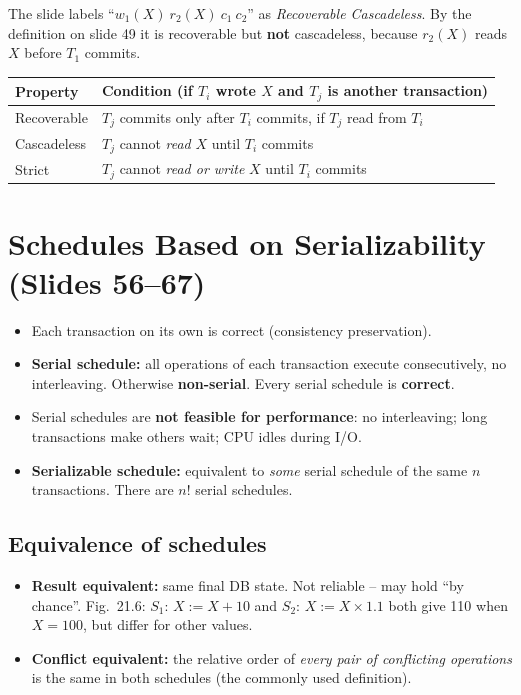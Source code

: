 \documentclass[10pt,a4paper]{article}
\begin{document}
\begin{warnbox}
The slide labels ``$w_1(X)\ r_2(X)\ c_1\ c_2$'' as \emph{Recoverable Cascadeless}. By the definition on slide 49 it is recoverable but \textbf{not} cascadeless, because $r_2(X)$ reads $X$ before $T_1$ commits.
\end{warnbox}

\begin{tabular}{@{}ll@{}}
\toprule
\textbf{Property} & \textbf{Condition} (if $T_i$ wrote $X$ and $T_j$ is another transaction)\\\midrule
Recoverable & $T_j$ commits only after $T_i$ commits, if $T_j$ read from $T_i$\\
Cascadeless & $T_j$ cannot \emph{read} $X$ until $T_i$ commits\\
Strict & $T_j$ cannot \emph{read or write} $X$ until $T_i$ commits\\
\bottomrule
\end{tabular}

\section{Schedules Based on Serializability (Slides 56--67)}

\begin{itemize}
  \item Each transaction on its own is correct (consistency preservation).
  \item \textbf{Serial schedule:} all operations of each transaction execute consecutively, no interleaving. Otherwise \textbf{non-serial}. Every serial schedule is \textbf{correct}.
  \item Serial schedules are \textbf{not feasible for performance}: no interleaving; long transactions make others wait; CPU idles during I/O.
  \item \textbf{Serializable schedule:} equivalent to \emph{some} serial schedule of the same $n$ transactions. There are $n!$ serial schedules.
\end{itemize}

\subsection*{Equivalence of schedules}
\begin{itemize}
  \item \textbf{Result equivalent:} same final DB state. Not reliable -- may hold ``by chance''. Fig.~21.6: $S_1$: $X := X + 10$ and $S_2$: $X := X \times 1.1$ both give 110 when $X=100$, but differ for other values.
  \item \textbf{Conflict equivalent:} the relative order of \emph{every pair of conflicting operations} is the same in both schedules (the commonly used definition).
\end{itemize}
\end{document}
